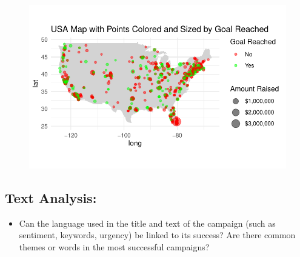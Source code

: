 \documentclass[
  letterpaper,
  DIV=11,
  numbers=noendperiod]{scrartcl}
\providecommand{\tightlist}{%
  \setlength{\itemsep}{0pt}\setlength{\parskip}{0pt}}\usepackage{longtable,booktabs,array}
\begin{document}
\begin{figure}[H]

{\centering \includegraphics{gfm_data_analysis_files/figure-pdf/geographical-analysis-1-1.pdf}

}

\end{figure}

\hypertarget{text-analysis}{%
\subsection{Text Analysis:}\label{text-analysis}}

\begin{itemize}
\tightlist
\item
  Can the language used in the title and text of the campaign (such as
  sentiment, keywords, urgency) be linked to its success? Are there
  common themes or words in the most successful campaigns?
\end{itemize}
\end{document}
